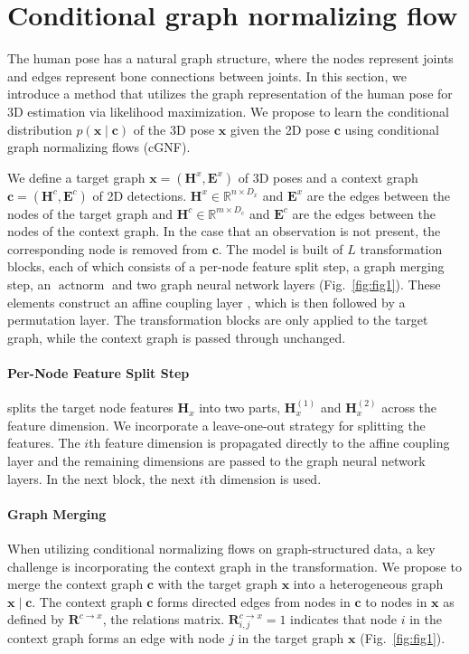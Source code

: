 \documentclass{article} \usepackage{iclr2023_conference,times}
\def\vc{{\bm{c}}}
\def\vx{{\bm{x}}}
\def\mE{{\bm{E}}}
\def\mH{{\bm{H}}}
\def\mR{{\bm{R}}}
\begin{document}
\section{Conditional graph normalizing flow}
    The human pose has a natural graph structure, where the nodes represent joints and edges represent bone connections between joints.
    In this section, we introduce a method that utilizes the graph representation of the human pose for 3D estimation via likelihood maximization.
    We propose to learn the conditional distribution $p(\vx \mid \vc)$ of the 3D pose $\vx$ given the 2D pose $\vc$ using conditional graph normalizing flows (cGNF).
    
    We define a target graph $\vx = (\mH^x, \mE^x)$ of 3D poses and a context graph $\vc = (\mH^c, \mE^c)$ of 2D detections.
    $\mH^x \in \mathbb{R}^{n\times D_x}$ and $\mE^x$ are the edges between the nodes of the target graph and $\mH^c \in \mathbb{R}^{m\times D_c}$ and $\mE^c$ are the edges between the nodes of the context graph.
    In the case that an observation is not present, the corresponding node is removed from $\vc$.
    The model is built of $L$ transformation blocks, each of which consists of a per-node feature split step, a graph merging step, an $\operatorname{actnorm}$ \citep{Kingma_Dhariwal_2018} and two graph neural network layers \citep{Gori2005} (Fig.~\ref{fig:fig1}).
    These elements construct an affine coupling layer \citep{Dinh_Sohl-Dickstein_Bengio_2016}, which is then followed by a permutation layer.
    The transformation blocks are only applied to the target graph, while the context graph is passed through unchanged.
    
    \paragraph{Per-Node Feature Split Step} splits the target node features $\mH_x$ into two parts, $\mH_x^{(1)}$ and $\mH_x^{(2)}$ across the feature dimension.
    We incorporate a leave-one-out strategy for splitting the features.
    The $i$th feature dimension is propagated directly to the affine coupling layer and the remaining dimensions are passed to the graph neural network layers.
    In the next block, the next $i$th dimension is used.

    \paragraph{Graph Merging}
    When utilizing conditional normalizing flows \cite{Winkler_Worrall_Hoogeboom_Welling_2019} on graph-structured data, a key challenge is incorporating the context graph in the transformation.
    We propose to merge the context graph $\mathbf c$ with the target graph $\vx$ into a heterogeneous graph $\vx\mid\vc$.
    The context graph $\mathbf c$ forms directed edges from nodes in $\vc$ to nodes in $\vx$ as defined by $\mR^{c\rightarrow x}$, the relations matrix.
    $\mR^{c\rightarrow x}_{i,j} = 1$ indicates that node $i$ in the context graph forms an edge with node $j$ in the target graph $\vx$ (Fig.~\ref{fig:fig1}).
    
\end{document}

